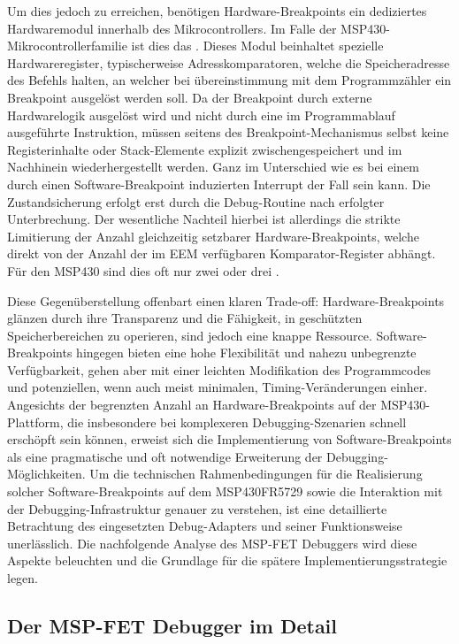 Um dies jedoch zu erreichen, ben\"otigen Hardware-Breakpoints ein dediziertes Hardwaremodul innerhalb des Mikrocontrollers. Im Falle der MSP430-Mikrocontrollerfamilie ist dies das  . Dieses Modul beinhaltet spezielle Hardwareregister, typischerweise Adresskomparatoren, welche die Speicheradresse des Befehls halten, an welcher bei \"ubereinstimmung mit dem Programmz\"ahler ein Breakpoint ausgel\"ost werden soll. Da der Breakpoint durch externe Hardwarelogik ausgel\"ost wird und nicht durch eine im Programmablauf ausgef\"uhrte Instruktion, m\"ussen seitens des Breakpoint-Mechanismus selbst keine Registerinhalte oder Stack-Elemente explizit zwischengespeichert und im Nachhinein wiederhergestellt werden. Ganz im Unterschied wie es bei einem durch einen Software-Breakpoint induzierten Interrupt der Fall sein kann. Die Zustandsicherung erfolgt erst durch die Debug-Routine nach erfolgter Unterbrechung. Der wesentliche Nachteil hierbei ist allerdings die strikte Limitierung der Anzahl gleichzeitig setzbarer Hardware-Breakpoints, welche direkt von der Anzahl der im EEM verf\"ugbaren Komparator-Register abh\"angt. F\"ur den MSP430 sind dies oft nur zwei oder drei .

Diese Gegen\"uberstellung offenbart einen klaren Trade-off: Hardware-Breakpoints gl\"anzen durch ihre Transparenz und die F\"ahigkeit, in gesch\"utzten Speicherbereichen zu operieren, sind jedoch eine knappe Ressource. Software-Breakpoints hingegen bieten eine hohe Flexibilit\"at und nahezu unbegrenzte Verf\"ugbarkeit, gehen aber mit einer leichten Modifikation des Programmcodes und potenziellen, wenn auch meist minimalen, Timing-Ver\"anderungen einher. Angesichts der begrenzten Anzahl an Hardware-Breakpoints auf der MSP430-Plattform, die insbesondere bei komplexeren Debugging-Szenarien schnell ersch\"opft sein k\"onnen, erweist sich die Implementierung von Software-Breakpoints als eine pragmatische und oft notwendige Erweiterung der Debugging-M\"oglichkeiten. Um die technischen Rahmenbedingungen f\"ur die Realisierung solcher Software-Breakpoints auf dem MSP430FR5729 sowie die Interaktion mit der Debugging-Infrastruktur genauer zu verstehen, ist eine detaillierte Betrachtung des eingesetzten Debug-Adapters und seiner Funktionsweise unerl\"asslich. Die nachfolgende Analyse des MSP-FET Debuggers wird diese Aspekte beleuchten und die Grundlage f\"ur die sp\"atere Implementierungsstrategie legen.

\subsection{Der MSP-FET Debugger im Detail}
\label{sec:MSP-FET_Debugger}

